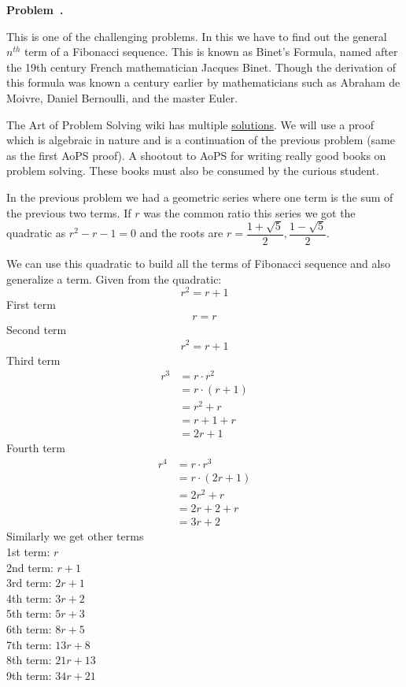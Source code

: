 \documentclass[10pt]{article}
\newcounter{problem}
\newenvironment{problem}[1][]{
  \refstepcounter{problem}
  \par\noindent\textbf{Problem~\theproblem. #1}\par
  \vspace{0.5em}
}{\vspace{1em}}
\begin{document}
\begin{problem} %
  This is one of the challenging problems. In this we have to find out the general $n^{th}$ term of a Fibonacci sequence.
  This is known as Binet's Formula, named after the 19th century French mathematician Jacques Binet. Though the derivation
  of this formula was known a century earlier by mathematicians such as Abraham de Moivre, Daniel Bernoulli, and the master Euler.

  The Art of Problem Solving wiki has multiple 
  \href{https://artofproblemsolving.com/wiki/index.php/Binet%27s_Formula?srsltid=AfmBOopZoFLXIajI-JoM3fYvZ8skdUXvlgDV4u0u3smoftRnyHuo1zZK}{solutions}.
  We will use a proof which is algebraic in nature and is a continuation of the previous problem (same as the first AoPS proof). A shootout to AoPS for writing
  really good books on problem solving. These books must also be consumed by the curious student.

  In the previous problem we had a geometric series where one term is the sum of the previous two terms. If $r$ was the common ratio
  this series we got the quadratic as $r^2 - r - 1 = 0$ and the roots are $r = \dfrac{1 + \sqrt{5}}{2}, \dfrac{1 - \sqrt{5}}{2}$.

  We can use this quadratic to build all the terms of Fibonacci sequence and also generalize a term.
  Given from the quadratic:
  \[
  r^2 = r + 1
  \]
  First term
  \begin{gather*}
    r = r
  \end{gather*}
  Second term
  \begin{gather*}
    r^2 = r + 1
  \end{gather*}
  Third term
  \begin{align*}
    r^3 &= r \cdot r^2\\
    &= r \cdot (r + 1)\\
    &= r^2 + r\\
    &= r + 1 + r\\ 
    &= 2r + 1
  \end{align*}
  Fourth term
  \begin{align*}
    r^4 &= r \cdot r^3\\
    &= r \cdot (2r + 1)\\
    &= 2r^2 + r\\
    &= 2r + 2 + r\\ 
    &= 3r + 2
  \end{align*}
  Similarly we get other terms\\
  1st term: $r$\\
  2nd term: $r + 1$\\
  3rd term: $2r + 1$\\
  4th term: $3r + 2$\\
  5th term: $5r + 3$\\
  6th term: $8r + 5$\\
  7th term: $13r + 8$\\
  8th term: $21r + 13$\\
  9th term: $34r + 21$\\


\end{problem}
\end{document}
